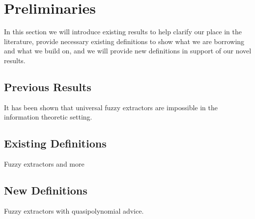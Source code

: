 
\section{Preliminaries}
In this section we will introduce existing results to help clarify our place in the literature, provide necessary existing definitions to show what we are borrowing and what we build on, and we will provide new definitions in support of our novel results.
\subsection{Previous Results}
It has been shown that universal fuzzy extractors are impossible in the information theoretic setting. 
\subsection{Existing Definitions}
Fuzzy extractors and more
\subsection{New Definitions}
Fuzzy extractors with quasipolynomial advice. 